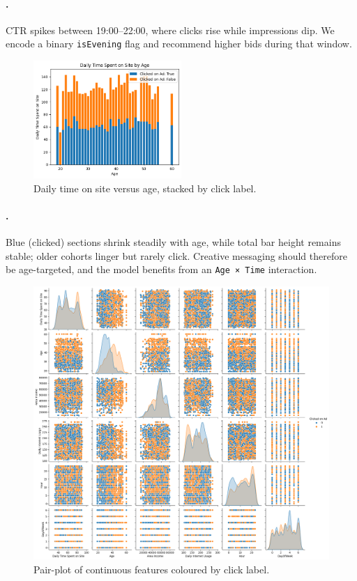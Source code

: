 \documentclass[12pt,a4paper]{article}
\begin{document}
\paragraph{.}
CTR spikes between 19:00–22:00, where clicks rise while impressions dip.
We encode a binary \texttt{isEvening} flag and recommend higher bids
during that window.

\begin{figure}[H]
  \centering
  \includegraphics[width=0.5\textwidth]{output8.png}
  \caption{Daily time on site versus age, stacked by click label.}
  \label{fig:age_time}
\end{figure}

\paragraph{.}
Blue (clicked) sections shrink steadily with age, while total bar height
remains stable; older cohorts linger but rarely click.  Creative
messaging should therefore be age-targeted, and the model benefits from
an \texttt{Age × Time} interaction.

\begin{figure}[H]
  \centering
  \includegraphics[width=\textwidth]{output5.png}
  \caption{Pair-plot of continuous features coloured by click label.}
  \label{fig:pairplot}
\end{figure}
\end{document}
